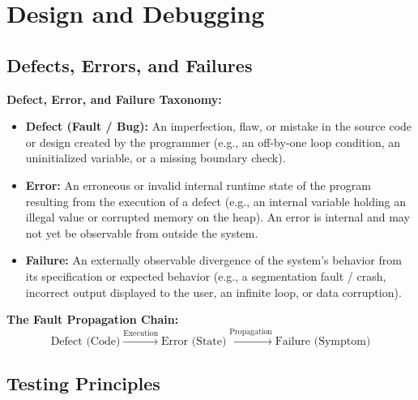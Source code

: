 \section{Design and Debugging}

\subsection{Defects, Errors, and Failures}

\begin{definition}
    \textbf{Defect, Error, and Failure Taxonomy:}
    \begin{itemize}
        \item \textbf{Defect (Fault / Bug):} An imperfection, flaw, or mistake in the source code or design created by the programmer (e.g., an off-by-one loop condition, an uninitialized variable, or a missing boundary check).
        \item \textbf{Error:} An erroneous or invalid internal runtime state of the program resulting from the execution of a defect (e.g., an internal variable holding an illegal value or corrupted memory on the heap). An error is internal and may not yet be observable from outside the system.
        \item \textbf{Failure:} An externally observable divergence of the system's behavior from its specification or expected behavior (e.g., a segmentation fault / crash, incorrect output displayed to the user, an infinite loop, or data corruption).
    \end{itemize}
\end{definition}

\begin{remark}
    \textbf{The Fault Propagation Chain:}
    $$\text{Defect (Code)} \xrightarrow{\text{Execution}} \text{Error (State)} \xrightarrow{\text{Propagation}} \text{Failure (Symptom)}$$
\end{remark}

\subsection{Testing Principles}

